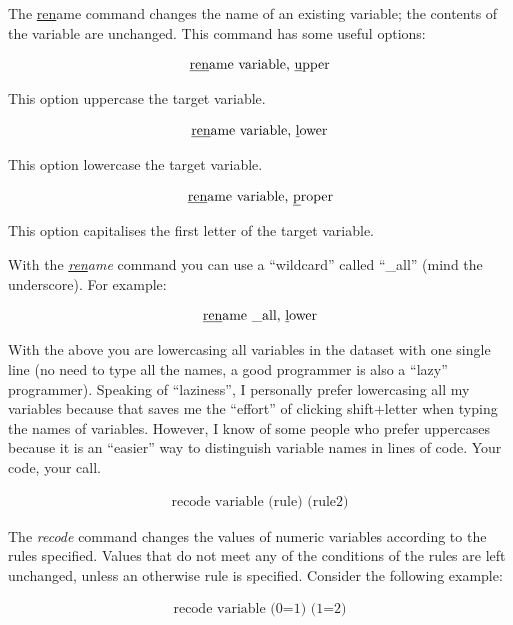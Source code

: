 \documentclass[paper=a4, fontsize=11pt]{scrartcl} %
\numberwithin{equation}{section} %
\numberwithin{figure}{section} %
\numberwithin{table}{section} %
\begin{document}
The \underline{ren}ame command changes the name of an existing variable; the contents of the variable are unchanged. This command has some useful options:

\begin{align}
\text{\underline{ren}ame variable, \underline{u}pper}
\end{align}

This option uppercase the target variable.

\begin{align}
\text{\underline{ren}ame variable, \underline{l}ower}
\end{align}

This option lowercase the target variable.

\begin{align}
\text{\underline{ren}ame variable, \underline{p}roper}
\end{align}

This option capitalises the first letter of the target variable.

With the \textit{\underline{ren}ame} command you can use a ``wildcard'' called ``\_all'' (mind the underscore). For example:

\begin{align}
\text{\underline{ren}ame \_all, \underline{l}ower}
\end{align}

With the above you are lowercasing all variables in the dataset with one single line (no need to type all the names, a good programmer is also a ``lazy'' programmer). Speaking of ``laziness'', I personally prefer lowercasing all my variables because that saves me the ``effort'' of clicking shift+letter when typing the names of variables. However, I know of some people who prefer uppercases because it is an ``easier'' way to distinguish variable names in lines of code. Your code, your call.

\begin{align}
\text{recode variable (rule) (rule2)}
\end{align}

The \textit{recode} command changes the values of numeric variables according to the rules specified. Values that do not meet any of the conditions of the rules are left unchanged, unless an otherwise rule is specified. Consider the following example:

\begin{align}
\text{recode variable (0=1) (1=2)}
\end{align}
\end{document}

